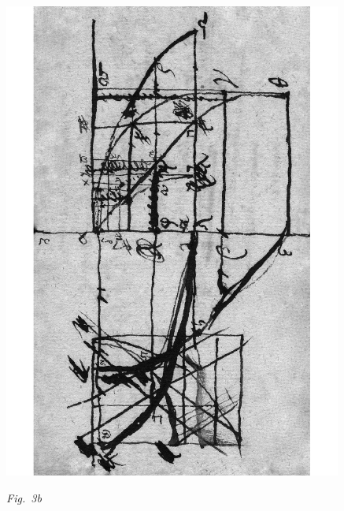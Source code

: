   \label{LH_35_09_15_013v_Fig.3}%
  \newpage%
%
%
  \centerline{\includegraphics[width=0.835\textwidth]{gesamttex/edit_VIII,3/images/LH_35_09_15_012-013_d3b.pdf}}%
  \vspace{0.5em}
  \centerline{\lbrack\textit{Fig.~3b}\rbrack}%
  \label{LH_35_09_15_013v_Fig.3_fs}
%
%
%
\newpage%
%
